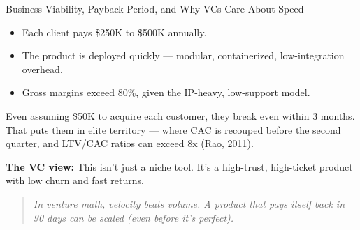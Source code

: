 \begin{TechnicalSidebar}{Business Viability, Payback Period, and Why VCs Care About Speed}
    \begin{itemize}
      \item Each client pays \$250K to \$500K annually.
      \item The product is deployed quickly — modular, containerized, low-integration overhead.
      \item Gross margins exceed 80\%, given the IP-heavy, low-support model.
    \end{itemize}
    
    \medskip
    
    Even assuming \$50K to acquire each customer, they break even within 3 months.  
    That puts them in elite territory — where CAC is recouped before the second quarter, and LTV/CAC ratios can exceed 8x (Rao, 2011).
    
    \medskip
    
    \textbf{The VC view:}  
    This isn’t just a niche tool. It’s a high-trust, high-ticket product with low churn and fast returns.
    
    \begin{quote}
    \textit{In venture math, velocity beats volume.  
    A product that pays itself back in 90 days can be scaled   
    (even before it's perfect).}
    \end{quote}
    
\end{TechnicalSidebar}
  
